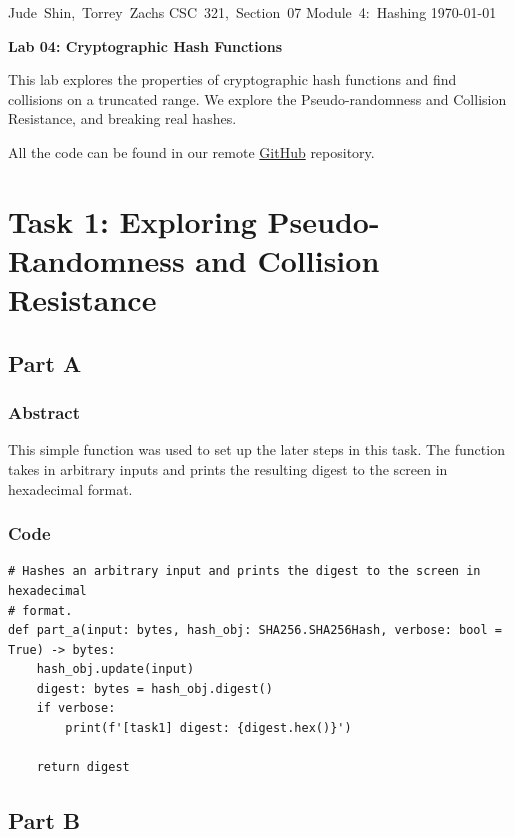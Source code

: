 \documentclass[11pt]{article}
\begin{document}
\hfill\vbox{\hbox{Jude Shin, Torrey Zachs}
		\hbox{CSC 321, Section 07}	
		\hbox{Module 4: Hashing}	
		\hbox{\today}}\par

\bigskip
\centerline{\Large\bf Lab 04: Cryptographic Hash Functions}\par
\bigskip

This lab explores the properties of cryptographic hash functions and find collisions on a truncated range. We explore the Pseudo-randomness and Collision Resistance, and breaking real hashes.

All the code can be found in our remote \href{https://github.com/jude-shin/CSC\_321}{GitHub} repository.

\section*{Task 1: Exploring Pseudo-Randomness and Collision Resistance}
\subsection*{Part A}
\subsubsection*{Abstract}
This simple function was used to set up the later steps in this task. The function takes in arbitrary inputs and prints the resulting digest to the screen in hexadecimal format.

\subsubsection*{Code}
\begin{lstlisting}
# Hashes an arbitrary input and prints the digest to the screen in hexadecimal
# format.
def part_a(input: bytes, hash_obj: SHA256.SHA256Hash, verbose: bool = True) -> bytes:
    hash_obj.update(input)
    digest: bytes = hash_obj.digest()
    if verbose: 
        print(f'[task1] digest: {digest.hex()}') 
    
    return digest
\end{lstlisting}

\subsection*{Part B}
\end{document}
